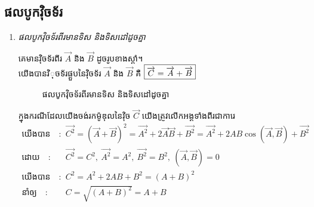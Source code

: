 \subsection{ផលបូកវុិចទ័រ}
\begin{enumerate}[m]
	\item \emph{\kml ផលបូកវុិចទ័រពីរមានទិស និងទិសដៅដូចគ្នា}
	\begin{multicols}{2}
			\quad គេមានវុិចទ័រពីរ $\overrightarrow{A}$ និង $\overrightarrow{B}$ ដូចរូបខាងស្តាំ។\\
		យើងបានវិុចទ័រផ្គួបនៃវុិចទ័រ $\overrightarrow{A}$ និង $\overrightarrow{B}$ គឺ $\fbox{$\overrightarrow{C}=\overrightarrow{A}+\overrightarrow{B}$}$
		\begin{figure}[H]
			\centering
			\caption{ផលបូកវុិចទ័រពីរមានទិស និងទិសដៅដូចគ្នា}
		\end{figure}
	\end{multicols}
	ក្នុងករណីដែលយើងចង់រកម៉ូឌុលនៃវុិច $\overrightarrow{C}$ យើងត្រូវលើកអង្គទាំងពីរជាការេ
	\begin{align*}
		\text{យើងបាន}\quad :&\quad \overrightarrow{C^{2}} =\left(\overrightarrow{A}+\overrightarrow{B}\right)^{2}=\overrightarrow{A^{2}} + 2\overrightarrow{A}\overrightarrow{B}+\overrightarrow{B^{2}}=\overrightarrow{A^{2}} + 2AB\cos\left(\overrightarrow{A},\overrightarrow{B}\right) +\overrightarrow{B^{2}}\\
		\text{ដោយ}\quad :&\quad \overrightarrow{C^{2}}=C^{2},~\overrightarrow{A^{2}}=A^{2},~\overrightarrow{B^{2}}=B^{2},~\left(\overrightarrow{A},\overrightarrow{B}\right)=0\\
		\text{យើងបាន}\quad :&\quad C^{2}=A^{2}+2AB+B^{2}=\left(A+B\right)^{2}\\
		\text{នាំឲ្យ}\quad :&\quad C=\sqrt{\left(A+B\right)^{2}}=A+B

\end{align*}
\end{enumerate}
